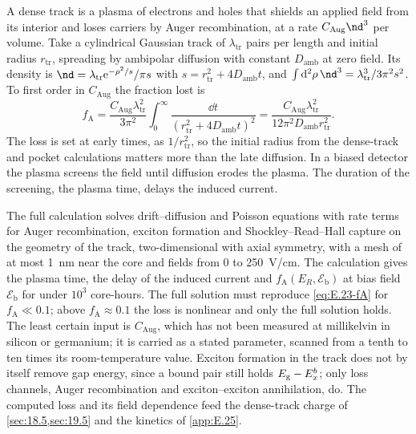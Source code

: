 A dense track is a plasma of electrons and holes that shields an applied field from its interior and loses carriers by Auger recombination, at a rate $C_{\mathrm{Aug}}\nd^3$ per volume. Take a cylindrical Gaussian track of $\lambda_{\mathrm{tr}}$ pairs per length and initial radius $r_{\mathrm{tr}}$, spreading by ambipolar diffusion with constant $D_{\mathrm{amb}}$ at zero field. Its density is $\nd = \lambda_{\mathrm{tr}}\ee^{-\rho^2/s}/\pi s$ with $s = r_{\mathrm{tr}}^2 + 4D_{\mathrm{amb}}t$, and $\int\dd^2\rho\,\nd^3 = \lambda_{\mathrm{tr}}^3/3\pi^2s^2$. To first order in $C_{\mathrm{Aug}}$ the fraction lost is
\begin{equation}
  f_{\mathrm{A}} = \frac{C_{\mathrm{Aug}}\lambda_{\mathrm{tr}}^2}{3\pi^2}\int_0^\infty\frac{\dd t}{(r_{\mathrm{tr}}^2 + 4D_{\mathrm{amb}}t)^2}
  = \frac{C_{\mathrm{Aug}}\lambda_{\mathrm{tr}}^2}{12\pi^2D_{\mathrm{amb}}r_{\mathrm{tr}}^2} .
  \label{eq:E.23-fA}
\end{equation}
The loss is set at early times, as $1/r_{\mathrm{tr}}^2$, so the initial radius from the dense-track and pocket calculations matters more than the late diffusion. In a biased detector the plasma screens the field until diffusion erodes the plasma. The duration of the screening, the plasma time, delays the induced current.

The full calculation solves drift--diffusion and Poisson equations with rate terms for Auger recombination, exciton formation and Shockley--Read--Hall capture on the geometry of the track, two-dimensional with axial symmetry, with a mesh of at most \SI{1}{nm} near the core and fields from 0 to \SI{250}{V/cm}. The calculation gives the plasma time, the delay of the induced current and $f_{\mathrm{A}}(E_R, \mathcal{E}_{\mathrm{b}})$ at bias field $\mathcal{E}_{\mathrm{b}}$ for under $10^3$ core-hours. The full solution must reproduce \cref{eq:E.23-fA} for $f_{\mathrm{A}} \ll 0.1$; above $f_{\mathrm{A}} \approx 0.1$ the loss is nonlinear and only the full solution holds. The least certain input is $C_{\mathrm{Aug}}$, which has not been measured at millikelvin in silicon or germanium; it is carried as a stated parameter, scanned from a tenth to ten times its room-temperature value. Exciton formation in the track does not by itself remove gap energy, since a bound pair still holds $E_{\mathrm{g}} - E_x^b$; only loss channels, Auger recombination and exciton--exciton annihilation, do. The computed loss and its field dependence feed the dense-track charge of \cref{sec:18.5,sec:19.5} and the kinetics of \cref{app:E.25}.

